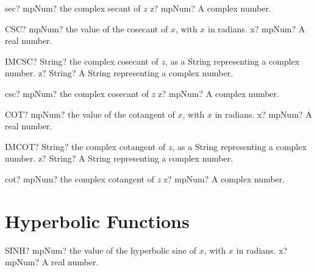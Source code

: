 \documentclass[12pt,a4paper,openany]{book}
\begin{document}
\begin{mpFunctionsExtract}
\mpFunctionOne
{sec? mpNum? the complex secant of $z$}
{z? mpNum? A complex number.}
\end{mpFunctionsExtract}

\begin{mpFunctionsExtract}
\mpWorksheetFunctionOneNotImplemented
{CSC? mpNum? the value of the cosecant of $x$, with $x$ in radians.}
{x? mpNum? A real number.}
\end{mpFunctionsExtract}

\begin{mpFunctionsExtract}
\mpWorksheetFunctionOneNotImplemented
{IMCSC? String? the complex cosecant of $z$, as a String representing a complex number.}
{z? String? A String representing a complex number.}
\end{mpFunctionsExtract}

\begin{mpFunctionsExtract}
\mpFunctionOne
{csc? mpNum? the complex cosecant of $z$}
{z? mpNum? A complex number.}
\end{mpFunctionsExtract}

\begin{mpFunctionsExtract}
\mpWorksheetFunctionOneNotImplemented
{COT? mpNum? the value of the cotangent of $x$, with $x$ in radians.}
{x? mpNum? A real number.}
\end{mpFunctionsExtract}

\begin{mpFunctionsExtract}
\mpWorksheetFunctionOneNotImplemented
{IMCOT? String? the complex cotangent of $z$, as a String representing a complex number.}
{z? String? A String representing a complex number.}
\end{mpFunctionsExtract}

\begin{mpFunctionsExtract}
\mpFunctionOne
{cot? mpNum? the complex cotangent of $z$}
{z? mpNum? A complex number.}
\end{mpFunctionsExtract}

\section{Hyperbolic Functions}

\begin{mpFunctionsExtract}
\mpWorksheetFunctionOneNotImplemented
{SINH? mpNum? the value of the hyperbolic sine of $x$, with $x$ in radians.}
{x? mpNum? A real number.}
\end{mpFunctionsExtract}
\end{document}
